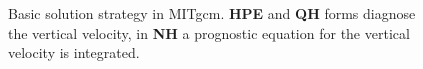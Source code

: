 \begin{figure}
  \begin{center}
  \end{center}
\caption{Basic solution strategy in MITgcm. {\bf HPE} and {\bf QH}
forms diagnose the vertical velocity, in {\bf NH} a prognostic
equation for the vertical velocity is integrated.}
\label{fig:solution-strategy}
\end{figure}
